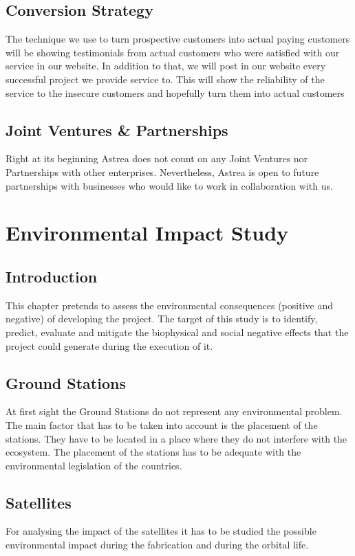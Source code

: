 \section{Conversion Strategy}
The technique we use to turn prospective customers into actual paying customers will be showing testimonials from actual customers who were satisfied with our service in our website. In addition to that, we will post in our website every successful project we provide service to. This will show the reliability of the service to the insecure customers and hopefully turn them into actual customers

\section{Joint Ventures \& Partnerships}
Right at its beginning Astrea does not count on any Joint Ventures nor Partnerships with other enterprises. Nevertheless, Astrea is open to future partnerships with businesses who would like to work in collaboration with us.

\chapter{Environmental Impact Study}

\section{Introduction}
This chapter pretends to assess the environmental consequences (positive and negative) of developing the project. The target of this study is to identify, predict, evaluate and mitigate the biophysical and social negative effects that the project could generate during the execution of it.

\section{Ground Stations}
At first sight the Ground Stations do not represent any environmental problem. The main factor that has to be taken into account is the placement of the stations. They have to be located in a place where they do not interfere with the ecosystem. The placement of the stations has to be adequate with the environmental legislation of the countries. 

\section{Satellites}
For analysing the impact of the satellites it has to be studied the possible environmental impact during the fabrication and during the orbital life.

